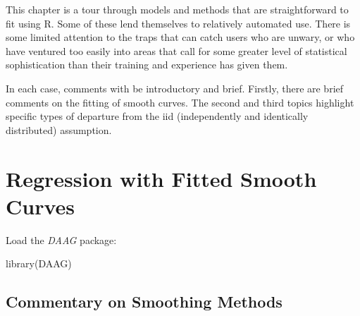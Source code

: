 



This chapter is a tour through models and methods that are
straightforward to fit using R.  Some of these lend themselves
to relatively automated use.   There is some limited attention
to the traps that can catch users who are unwary, or who have
ventured too easily into areas that call for some greater level
of statistical sophistication than their training and experience
has given them.

In each case, comments with be introductory and brief.  Firstly, there
are brief comments on the fitting of smooth curves.  The second and
third topics highlight specific types of departure from the iid
(independently and identically distributed) assumption.

\section{Regression with Fitted Smooth Curves}

Load the {\em DAAG} package:
\begin{Schunk}
\begin{Sinput}
library(DAAG)
\end{Sinput}
\end{Schunk}

\subsection*{Commentary  on Smoothing Methods}

